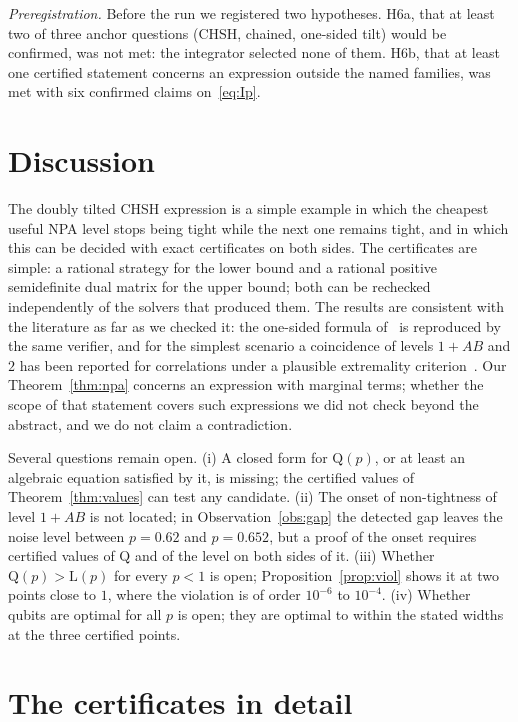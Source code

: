 \documentclass[10pt,twocolumn,a4paper]{article}
\theoremstyle{definition}
\theoremstyle{remark}
\newcommand{\Q}{\mathrm{Q}}
\newcommand{\Lc}{\mathrm{L}}
\begin{document}
\emph{Preregistration.} Before the run we registered two hypotheses. H6a, that at least two of three anchor questions (CHSH,
chained, one-sided tilt) would be confirmed, was not met: the integrator selected none of them. H6b, that at least one certified
statement concerns an expression outside the named families, was met with six confirmed claims on~\eqref{eq:Ip}.

\section{Discussion}

The doubly tilted CHSH expression is a simple example in which the cheapest useful NPA level stops being tight while the next one
remains tight, and in which this can be decided with exact certificates on both sides. The certificates are simple: a rational
strategy for the lower bound and a rational positive semidefinite dual matrix for the upper bound; both can be rechecked
independently of the solvers that produced them. The results are consistent with the literature as far as we checked it: the
one-sided formula of~\cite{amp} is reproduced by the same verifier, and for the simplest scenario a coincidence of levels $1{+}AB$
and $2$ has been reported for correlations under a plausible extremality criterion~\cite{ishizaka}. Our Theorem~\ref{thm:npa}
concerns an expression with marginal terms; whether the scope of that statement covers such expressions we did not check beyond
the abstract, and we do not claim a contradiction.

Several questions remain open. (i) A closed form for $\Q(p)$, or at least an algebraic equation satisfied by it, is missing; the
certified values of Theorem~\ref{thm:values} can test any candidate. (ii) The onset of non-tightness of level $1{+}AB$ is not
located; in Observation~\ref{obs:gap} the detected gap leaves the noise level between $p=0.62$ and $p=0.652$, but a proof of
the onset requires certified values of $\Q$ and of the level on both sides of it. (iii) Whether $\Q(p)>\Lc(p)$ for every $p<1$ is open; Proposition~\ref{prop:viol} shows it at two points close to
$1$, where the violation is of order $10^{-6}$ to $10^{-4}$. (iv) Whether qubits are optimal for all $p$ is open; they are
optimal to within the stated widths at the three certified points.

\appendix
\section{The certificates in detail}\label{app:cert}
\end{document}
